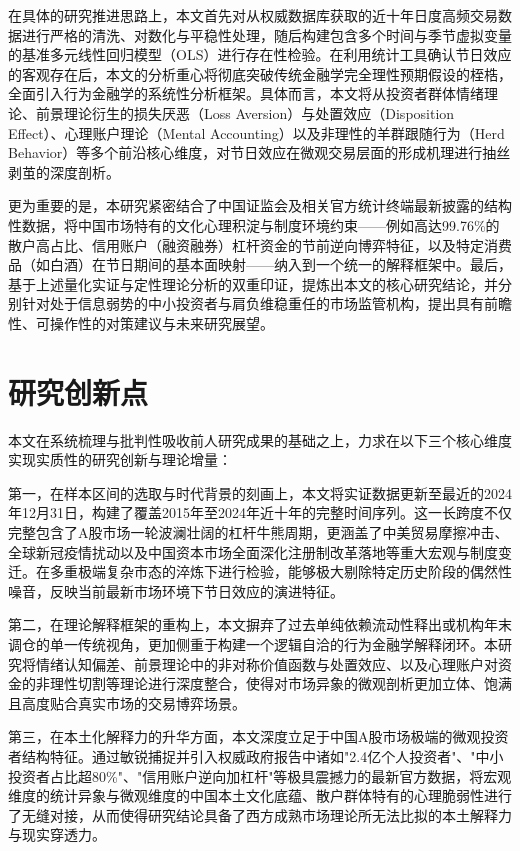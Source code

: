 \documentclass{cupb-thesis}
\begin{document}
在具体的研究推进思路上，本文首先对从权威数据库获取的近十年日度高频交易数据进行严格的清洗、对数化与平稳性处理，随后构建包含多个时间与季节虚拟变量的基准多元线性回归模型（OLS）进行存在性检验。在利用统计工具确认节日效应的客观存在后，本文的分析重心将彻底突破传统金融学完全理性预期假设的桎梏，全面引入行为金融学的系统性分析框架。具体而言，本文将从投资者群体情绪理论、前景理论衍生的损失厌恶（Loss Aversion）与处置效应（Disposition Effect）、心理账户理论（Mental Accounting）以及非理性的羊群跟随行为（Herd Behavior）等多个前沿核心维度，对节日效应在微观交易层面的形成机理进行抽丝剥茧的深度剖析。


更为重要的是，本研究紧密结合了中国证监会及相关官方统计终端最新披露的结构性数据，将中国市场特有的文化心理积淀与制度环境约束——例如高达99.76\%的散户高占比、信用账户（融资融券）杠杆资金的节前逆向博弈特征，以及特定消费品（如白酒）在节日期间的基本面映射——纳入到一个统一的解释框架中。最后，基于上述量化实证与定性理论分析的双重印证，提炼出本文的核心研究结论，并分别针对处于信息弱势的中小投资者与肩负维稳重任的市场监管机构，提出具有前瞻性、可操作性的对策建议与未来研究展望。


\section{研究创新点}


本文在系统梳理与批判性吸收前人研究成果的基础之上，力求在以下三个核心维度实现实质性的研究创新与理论增量：

第一，在样本区间的选取与时代背景的刻画上，本文将实证数据更新至最近的2024年12月31日，构建了覆盖2015年至2024年近十年的完整时间序列。这一长跨度不仅完整包含了A股市场一轮波澜壮阔的杠杆牛熊周期，更涵盖了中美贸易摩擦冲击、全球新冠疫情扰动以及中国资本市场全面深化注册制改革落地等重大宏观与制度变迁。在多重极端复杂市态的淬炼下进行检验，能够极大剔除特定历史阶段的偶然性噪音，反映当前最新市场环境下节日效应的演进特征。

第二，在理论解释框架的重构上，本文摒弃了过去单纯依赖流动性释出或机构年末调仓的单一传统视角，更加侧重于构建一个逻辑自洽的行为金融学解释闭环。本研究将情绪认知偏差、前景理论中的非对称价值函数与处置效应、以及心理账户对资金的非理性切割等理论进行深度整合，使得对市场异象的微观剖析更加立体、饱满且高度贴合真实市场的交易博弈场景。

第三，在本土化解释力的升华方面，本文深度立足于中国A股市场极端的微观投资者结构特征。通过敏锐捕捉并引入权威政府报告中诸如"2.4亿个人投资者"、"中小投资者占比超80\%"、"信用账户逆向加杠杆"等极具震撼力的最新官方数据，将宏观维度的统计异象与微观维度的中国本土文化底蕴、散户群体特有的心理脆弱性进行了无缝对接，从而使得研究结论具备了西方成熟市场理论所无法比拟的本土解释力与现实穿透力。
\end{document}
